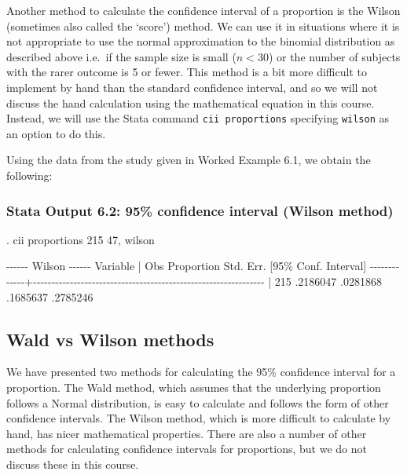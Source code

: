 \documentclass[
]{memoir}
\newenvironment{Shaded}{\begin{snugshade}}{\end{snugshade}}
\newcommand{\NormalTok}[1]{#1}
\begin{document}
Another method to calculate the confidence interval of a proportion is the Wilson (sometimes also called the `score') method. We can use it in situations where it is not appropriate to use the normal approximation to the binomial distribution as described above i.e.~if the sample size is small (\(n < 30\)) or the number of subjects with the rarer outcome is 5 or fewer. This method is a bit more difficult to implement by hand than the standard confidence interval, and so we will not discuss the hand calculation using the mathematical equation in this course. Instead, we will use the Stata command \texttt{cii\ proportions} specifying \texttt{wilson} as an option to do this.

Using the data from the study given in Worked Example 6.1, we obtain the following:

\hypertarget{stata-output-6.2-95-confidence-interval-wilson-method}{%
\subsubsection*{Stata Output 6.2: 95\% confidence interval (Wilson method)}\label{stata-output-6.2-95-confidence-interval-wilson-method}}

\begin{Shaded}
\begin{Highlighting}[]
\NormalTok{. cii proportions 215 47, wilson}

\NormalTok{                                                         {-}{-}{-}{-}{-}{-} Wilson {-}{-}{-}{-}{-}{-}}
\NormalTok{    Variable |        Obs  Proportion    Std. Err.       [95\% Conf. Interval]}
\NormalTok{{-}{-}{-}{-}{-}{-}{-}{-}{-}{-}{-}{-}{-}+{-}{-}{-}{-}{-}{-}{-}{-}{-}{-}{-}{-}{-}{-}{-}{-}{-}{-}{-}{-}{-}{-}{-}{-}{-}{-}{-}{-}{-}{-}{-}{-}{-}{-}{-}{-}{-}{-}{-}{-}{-}{-}{-}{-}{-}{-}{-}{-}{-}{-}{-}{-}{-}{-}{-}{-}{-}{-}{-}{-}{-}{-}{-}}
\NormalTok{             |        215    .2186047    .0281868        .1685637    .2785246}
\end{Highlighting}
\end{Shaded}

\hypertarget{wald-vs-wilson-methods}{%
\subsection{Wald vs Wilson methods}\label{wald-vs-wilson-methods}}

We have presented two methods for calculating the 95\% confidence interval for a proportion. The Wald method, which assumes that the underlying proportion follows a Normal distribution, is easy to calculate and follows the form of other confidence intervals. The Wilson method, which is more difficult to calculate by hand, has nicer mathematical properties. There are also a number of other methods for calculating confidence intervals for proportions, but we do not discuss these in this course.
\end{document}
